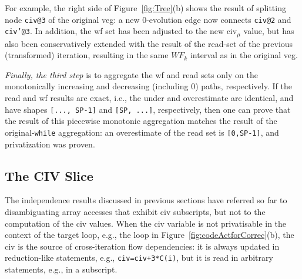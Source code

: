 \documentclass{sig-alternate}
\begin{document}
For example, the right side of Figure~\ref{fig:Tree}(b) shows the result of
splitting  node {\tt civ@3} of the original {\sc veg}: a new $0$-evolution
edge now connects {\tt civ@2} and {\tt civ'@3}. In addition, the {\sc wf} set 
has been adjusted to the new {\sc civ}$_\mu$ value, but has also
been conservatively extended with the result of the read-set of the previous
(transformed) iteration, resulting in the same $WF_k$ interval as 
in the original {\sc veg}. 



{\em Finally, the third step} is to aggregate the {\sc wf} and read sets 
only on the monotonically increasing and decreasing (including $0$) paths,
respectively. 
If the read and {\sc wf} results are exact, i.e., the under 
and overestimate are identical, and have shapes {\tt [..., SP-1]}  
and {\tt[SP, ...]}, respectively, then 
one can prove that the result of this piecewise monotonic
aggregation matches the result of the original-{\tt while} aggregation:
an overestimate of the 
read set is {\tt [0,SP-1]}, and privatization was proven.

\subsection{The CIV Slice}
\label{subsect:CivImplem}

The independence results discussed in previous sections have referred 
so far to disambiguating array accesses that exhibit {\sc civ} 
subscripts, but not to the computation of the {\sc civ} values.
%
When the {\sc civ} variable is not privatisable in the context of the 
target loop, e.g., the loop in Figure~\ref{fig:codeActforCorrec}(b), 
the {\sc civ} is the source of cross-iteration flow dependencies: %
it is always updated in reduction-like statements, e.g., {\tt civ=civ+3*C(i)},
but it is read in arbitrary statements, e.g., in a subscript.
\end{document}
